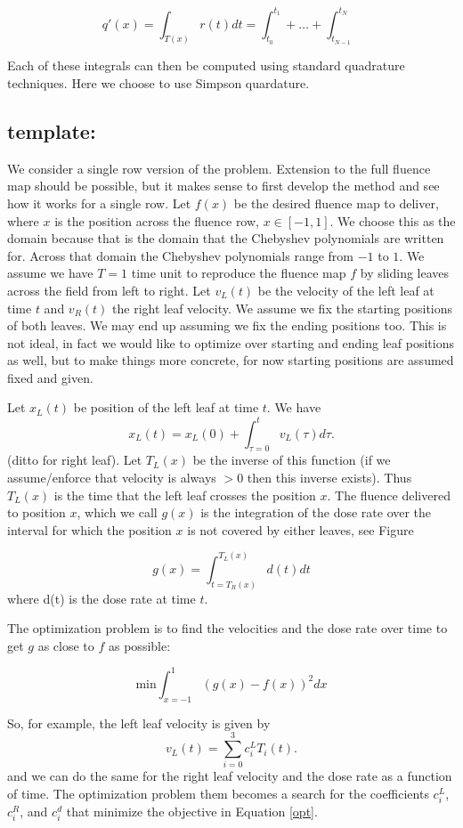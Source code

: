 \begin{equation}
q'(x) = \int_{T(x)} r(t) dt = \int_{t_0}^ {t_1} + \dots + \int_{t_{N-1}}^ {t_N}
\label{eqn:deliveredFluenceDoseSum}
\end{equation}

Each of these integrals can then be computed using standard quadrature techniques.
Here we choose to use Simpson quardature.

\subsection{template:}

We consider a single row version of the problem. Extension to the full fluence map should be possible, but it makes sense
to first develop the method and see how it works for a single row. Let $f(x)$ be the desired fluence map to deliver, where
$x$ is the position across the fluence row, $x \in [-1,1]$. We choose this as the domain because that is the
domain that the Chebyshev polynomials are written for. Across that domain the Chebyshev polynomials range from $-1$ to $1$.
We assume we have $T=1$ time unit to reproduce the fluence map $f$ by sliding leaves across the field from left to right.
Let $v_L(t)$ be the velocity of the left leaf at time $t$ and $v_R(t)$ the right leaf velocity. We assume we fix the starting positions
of both leaves. We may end up assuming we fix the ending positions too. This is not ideal, in fact we would like to optimize over
starting and ending leaf positions as well, but to make things more concrete, for now starting positions are assumed fixed and given.

Let $x_L(t)$ be position of the left leaf at time $t$. We have
\begin{equation}
  x_L(t) = x_L(0) + \int_{\tau=0}^t v_L(\tau) d\tau.
\end{equation}
\noindent (ditto for right leaf). Let $T_L(x)$ be the inverse of this function
(if we assume/enforce that velocity is always $>0$ then this inverse exists). Thus
$T_L(x)$ is the time that the left leaf crosses the position $x$. The fluence delivered to position
$x$, which we call $g(x)$ is the integration of the dose rate over the interval for which the position $x$ is not covered by either leaves, see Figure

\begin{equation}
  g(x) = \int_{t = T_R(x)}^{T_L(x)} d(t) dt
\end{equation}
\noindent where d(t) is the dose rate at time $t$.

The optimization problem is to find the velocities and the dose rate over time to get $g$ as close to $f$ as possible:

\begin{equation}
\mathrm{min} \int_{x=-1}^1 \left ( g(x) - f(x) \right )^2 dx
\label{opt}
\end{equation}


So, for example, the left leaf velocity is given by
$$
v_L(t) = \sum_{i=0}^3 c^L_i T_i(t).
$$
\noindent and we can do the same for the right leaf velocity and the dose rate as a function of time.
The optimization problem them becomes a search for the coefficients $c^L_i$, $c^R_i$, and $c^d_i$ that minimize the objective in Equation \ref{opt}.

